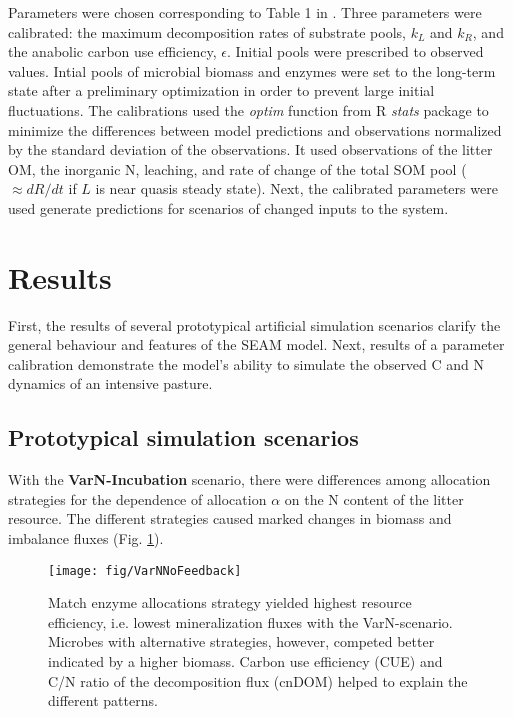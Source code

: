 Parameters were chosen corresponding to Table 1 in \citep{Perveen14}. Three
parameters were calibrated: the maximum decomposition rates of substrate pools,
$k_L$ and $k_R$, and the anabolic carbon use efficiency, $\epsilon$. Initial
pools were prescribed to observed values. Intial pools of microbial biomass and
enzymes were set to the long-term state after a preliminary optimization in
order to prevent large initial fluctuations. The calibrations used the
\textit{optim} function from R \textit{stats} package \citep{R07} to minimize
the differences between model predictions and observations normalized by the
standard deviation of the observations. It used observations of the litter
OM, the inorganic N, leaching, and rate of change of the total SOM pool
($\approx dR/dt$ if $L$ is near quasis steady state). Next, the calibrated
parameters were used generate predictions for scenarios of changed inputs to
the system.

 
\section{Results}

First, the results of several prototypical artificial simulation scenarios
clarify the general behaviour and features of the SEAM model. Next, results of a
parameter calibration demonstrate the model's ability to
simulate the observed C and N dynamics of an intensive pasture.

\subsection{Prototypical simulation scenarios}
\label{sec:ResultsProto}

With the \textbf{VarN-Incubation} scenario, there were differences among
allocation strategies for the dependence of allocation $\alpha$ on the N
content of the litter resource. The different strategies caused marked changes
in biomass and imbalance fluxes (Fig. \ref{fig:VarNNoFeedback}).
 
\begin{figure}[t] \vspace*{2mm}
\begin{center}
\texttt{[image: fig/VarNNoFeedback]}
\end{center}
\caption{
Match enzyme allocations strategy yielded highest resource efficiency, i.e.
lowest mineralization fluxes with the VarN-scenario. Microbes with alternative
strategies, however, competed better indicated by a higher biomass. Carbon use
efficiency (CUE) and C/N ratio of the decomposition flux (cnDOM) helped to
explain the different patterns.
\label{fig:VarNNoFeedback}}
\end{figure}

